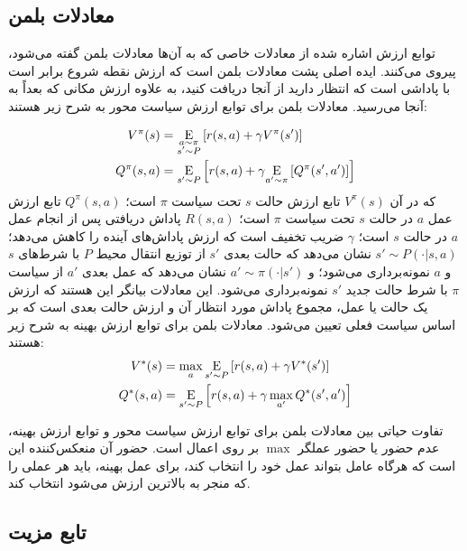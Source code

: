   \subsection{ معادلات بلمن}
   
   توابع ارزش اشاره شده از معادلات خاصی که به آن‌ها معادلات بلمن گفته می‌شود، پیروی می‌کنند. ایده اصلی پشت معادلات بلمن است که
   ارزش نقطه شروع برابر است با پاداشی است که انتظار دارید از آنجا دریافت کنید، به علاوه ارزش مکانی که بعداً به آنجا می‌رسید.
   معادلات بلمن برای توابع ارزش سیاست محور به شرح زیر هستند:
  
  \begin{align}
  	V^{\pi}(s) &=  \underset{\substack{a \sim \pi \\ s'\sim P}}{\mathrm{E}} 
  	\left[
  	{r(s,a) + \gamma V^{\pi}(s')}
  	\right] \\
  	  	Q^{\pi}(s,a) &= \underset{s'\sim P}{\mathrm{E}}
  	  	\left[
  	  	{r(s,a) + \gamma \underset{a'\sim \pi}{\mathrm{E}}\left[
  	  		{Q^{\pi}(s',a')}
  	  		\right]
  	  	}
  	  	\right]
  \end{align}
  که در آن \( V^\pi(s) \) تابع ارزش حالت \( s \) تحت سیاست \( \pi \) است؛ \( Q^\pi(s,a) \) تابع ارزش عمل \( a \) در حالت \( s \) تحت سیاست \( \pi \) است؛ \( R(s,a) \) پاداش دریافتی پس از انجام عمل \( a \) در حالت \( s \) است؛ \( \gamma \) ضریب تخفیف است که ارزش پاداش‌های آینده را کاهش می‌دهد؛ \( s' \sim P(\cdot|s,a) \) نشان می‌دهد که حالت بعدی \( s' \) از توزیع انتقال محیط \( P \) با شرط‌های \( s \) و \( a \) نمونه‌برداری می‌شود؛ و \( a' \sim \pi(\cdot|s') \) نشان می‌دهد که عمل بعدی \( a' \) از سیاست \( \pi \) با شرط حالت جدید \( s' \) نمونه‌برداری می‌شود.
  این معادلات بیانگر این هستند که ارزش یک حالت یا عمل، مجموع پاداش مورد انتظار آن و ارزش حالت بعدی است که بر اساس سیاست فعلی تعیین می‌شود.
  معادلات بلمن برای توابع ارزش بهینه به شرح زیر هستند:
\begin{align}
	V^*(s) &= \max_a \underset{s'\sim P}{\mathrm{E}}\left[
	{r(s,a) + \gamma V^*(s')}\right] \\
	Q^*(s,a) &= \underset{s'\sim P}{\mathrm{E}}\left[
	{r(s,a) + \gamma \max_{a'} Q^*(s',a')}\right]
\end{align}
  
  تفاوت حیاتی بین معادلات بلمن برای توابع ارزش سیاست محور و توابع ارزش بهینه، عدم حضور یا حضور عملگر \(\max\) بر روی اعمال است. حضور آن منعکس‌کننده این است که هرگاه عامل بتواند عمل خود را انتخاب کند، برای عمل بهینه، باید هر عملی را که منجر به بالاترین ارزش می‌شود انتخاب کند.
  
  
  \subsection{تابع مزیت}
  
